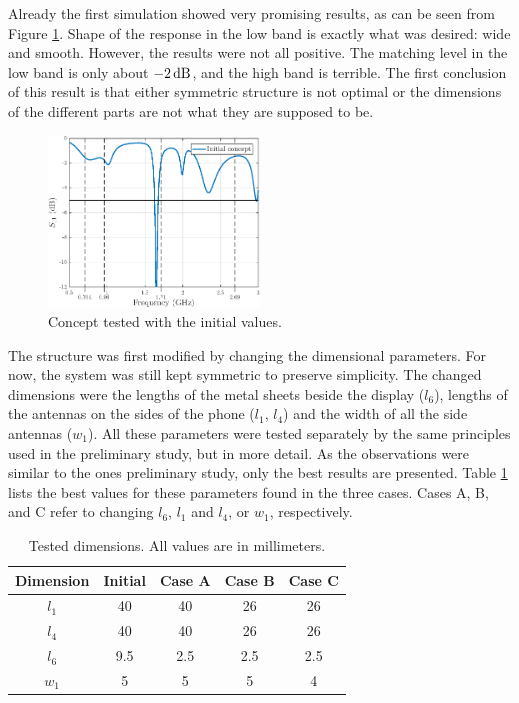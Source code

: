 Already the first simulation showed very promising results, as can be seen from Figure \ref{fig:concept_ini}. Shape of the response in the low band is exactly what was desired: wide and smooth. However, the results were not all positive. The matching level in the low band is only about $-2\,\mathrm{dB}$, and the high band is terrible. The first conclusion of this result is that either symmetric structure is not optimal or the dimensions of the different parts are not what they are supposed to be.
\begin{figure}[H]
    \centering
    \includegraphics[width=0.5\textwidth]{img/concept_ini.eps}
    \caption{Concept tested with the initial values.}
    \label{fig:concept_ini}
\end{figure}

The structure was first modified by changing the dimensional parameters. For now, the system was still kept symmetric to preserve simplicity. The changed dimensions were the lengths of the metal sheets beside the display ($l_6$), lengths of the antennas on the sides of the phone ($l_1$, $l_4$) and the width of all the side antennas ($w_1$).  All these parameters were tested separately by the same principles used in the preliminary study, but in more detail. As the observations were similar to the ones preliminary study, only the best results are presented. Table \ref{tab:concept2} lists the best values for these parameters found in the three cases. Cases A, B, and C refer to changing $l_6$, $l_1$ and $l_4$, or $w_1$, respectively. 
\begin{table}[H]
    \centering
    \caption{Tested dimensions. All values are in millimeters.}
    \label{tab:concept2}
    \begin{tabular}{|c|c|c|c|c|}
        \hline
        \textbf{Dimension} & \textbf{Initial} & \textbf{Case A} & \textbf{Case B} & \textbf{Case C}\\
        \hline
        $l_1$ & 40 & 40 & 26 & 26\\
        \hline
        $l_4$ & 40 & 40 & 26 & 26\\
        \hline
        $l_6$ & 9.5 & 2.5 & 2.5 & 2.5\\
        \hline
        $w_1$ & 5 & 5 & 5 & 4\\
        \hline
    \end{tabular}
\end{table}

